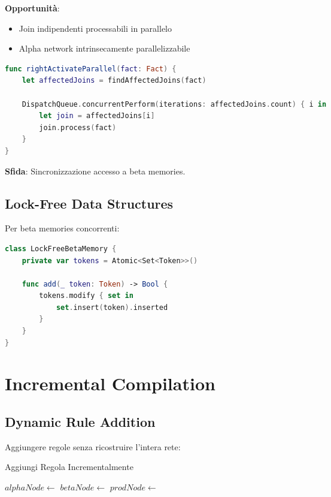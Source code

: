 \textbf{Opportunità}:
\begin{itemize}
\item Join indipendenti processabili in parallelo
\item Alpha network intrinsecamente parallelizzabile
\end{itemize}

\begin{lstlisting}[language=Swift]
func rightActivateParallel(fact: Fact) {
    let affectedJoins = findAffectedJoins(fact)
    
    DispatchQueue.concurrentPerform(iterations: affectedJoins.count) { i in
        let join = affectedJoins[i]
        join.process(fact)
    }
}
\end{lstlisting}

\textbf{Sfida}: Sincronizzazione accesso a beta memories.

\subsection{Lock-Free Data Structures}

Per beta memories concorrenti:

\begin{lstlisting}[language=Swift]
class LockFreeBetaMemory {
    private var tokens = Atomic<Set<Token>>()
    
    func add(_ token: Token) -> Bool {
        tokens.modify { set in
            set.insert(token).inserted
        }
    }
}
\end{lstlisting}

\section{Incremental Compilation}

\subsection{Dynamic Rule Addition}

Aggiungere regole senza ricostruire l'intera rete:

\begin{algorithm}
\caption{Aggiungi Regola Incrementalmente}
\begin{algorithmic}[1]
    \State $alphaNode \gets $ 
    \State $betaNode \gets $ 
  \EndFor
  \State $prodNode \gets $ 
  \State {}
\EndFunction
\end{algorithmic}
\end{algorithm}

